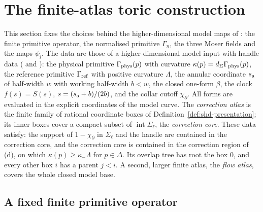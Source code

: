 \section{The finite-atlas toric construction}\label{sec:native-toric}

This section fixes the choices behind the higher-dimensional model maps of : the finite primitive operator,
the normalised primitive $\Gamma_n$, the three Moser fields and the maps $\psi_i$. The data are those of a higher-dimensional
model input with handle data ( and ): the physical primitive
$\Gamma_{\rm phys}(p)$ with curvature $\kappa(p)=d_\Sigma\Gamma_{\rm phys}(p)$, the reference primitive $\Gamma_{\rm ref}$ with
positive curvature $\Lambda$, the annular coordinate $s_{\rm a}$ of half-width $w$ with working half-width $b<w$, the closed
one-form $\beta$, the clock $f(s)=S(s)$, $s=(s_{\rm a}+b)/(2b)$, and the collar cutoff $\chi_\partial$. All forms are evaluated
in the explicit coordinates of the model curve. The \emph{correction atlas} is the finite family of rational coordinate boxes of
Definition~\ref{def:shd-presentation}; its inner boxes cover a compact subset of $\operatorname{int}\Sigma_\ell$, the
\emph{correction core}. These data satisfy: the support of $1-\chi_\partial$ in $\Sigma_\ell$ and the handle are contained
in the correction core, and the correction core is contained in the correction region of
(d), on which $\kappa(p)\ge\kappa_-\Lambda$ for $p\in\Delta$. Its overlap tree has root
the box $0$, and every other box $i$ has a parent $j<i$. A second, larger finite atlas, the \emph{flow atlas}, covers the
whole closed model base.

\subsection{A fixed finite primitive operator}

